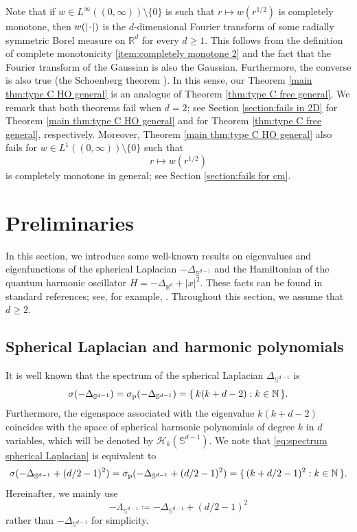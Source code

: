 \documentclass[reqno]{amsart}
\theoremstyle{plain}
\numberwithin{equation}{section}
\theoremstyle{remark}
\newcommand*{\variabledot}{\makebox[1ex]{\textbf{$\cdot$}}}
\newcommand{\R}{\mathbb{R}}
\newcommand{\N}{\mathbb{N}}
\renewcommand{\S}{\mathbb{S}}
\newcommand{\intervaloo}[2]{(#1, #2)}
\newcommand{\abs}[1]{\lvert#1\rvert}
\newcommand{\set}[2]{\{ \, #1 : #2 \, \} }
\newcommand{\Hamiltonian}{H}
\newcommand{\Laplacian}{\Delta}
\newcommand{\LaplacianR}{\Laplacian_{\R^d}}
\newcommand{\LaplacianS}{\Laplacian_{\S^{d-1}}}
\newcommand{\LambdaS}{\Lambda_{\S^{d-1}}}
\newcommand{\HPk}[1]{ \mathcal{H}_{#1} }
\begin{document}
Note that if $w \in L^\infty(\intervaloo{0}{\infty}) \setminus \{0\}$ is such that $r \mapsto w(r^{1/2})$ is completely monotone, then $w(\abs{\variabledot})$ is the $d$-dimensional Fourier transform of some radially symmetric Borel measure on $\R^d$ for every $d \geq 1$.
This follows from the definition of complete monotonicity \ref{item:completely monotone 2} and the fact that the Fourier transform of the Gaussian is also the Gaussian. 
Furthermore, the converse is also true (the Schoenberg theorem \cite[Theorem 2]{Sch1938}). 
In this sense, our Theorem \ref{main thm:type C HO general} is an analogue of Theorem \ref{thm:type C free general}.
We remark that both theorems fail when $d=2$; see Section \ref{section:fails in 2D} for Theorem \ref{main thm:type C HO general} and \citet[Theorem 6.2]{Suz2025} for Theorem \ref{thm:type C free general}, respectively.
Moreover, Theorem \ref{main thm:type C HO general} also fails for $w \in L^1(\intervaloo{0}{\infty}) \setminus \{0\}$ such that
\begin{equation}
	r \longmapsto w(r^{1/2})
\end{equation}
is completely monotone in general; see Section \ref{section:fails for cm}.
\section{Preliminaries} \label{section:preliminaries}
In this section, we introduce some well-known results on eigenvalues and eigenfunctions of the spherical Laplacian $-\LaplacianS$ and the Hamiltonian of the quantum harmonic oscillator $\Hamiltonian = - \LaplacianR + \abs{x}^2$.
These facts can be found in standard references; see, for example, \citet{Mul1966, Tha1993, Sze1975}. 
Throughout this section, we assume that $d \geq 2$.
\subsection{Spherical Laplacian and harmonic polynomials} \label{section:spherical Laplacian}
It is well known that the spectrum of the spherical Laplacian $\LaplacianS$ is
\begin{equation} \label{eq:spectrum spherical Laplacian}
\sigma(-\LaplacianS) = \sigma_{\textup{p}}(-\LaplacianS) = \set{ k (k + d - 2) }{ k \in \N } .
\end{equation}
Furthermore, the eigenspace associated with the eigenvalue $k (k + d - 2)$ coincides with the space of spherical harmonic polynomials of degree $k$ in $d$ variables, which will be denoted by $\HPk{k}(\S^{d-1})$.
We note that \eqref{eq:spectrum spherical Laplacian} is equivalent to 
\begin{equation}
\sigma(-\LaplacianS + (d/2-1)^2) = \sigma_{\textup{p}}(-\LaplacianS + (d/2-1)^2) = \set{ (k + d/2 - 1)^2 }{ k \in \N } .
\end{equation}
Hereinafter, we mainly use
\begin{equation}
-\LambdaS \coloneqq -\LaplacianS + (d/2-1)^2
\end{equation}
rather than $-\LaplacianS$ for simplicity. 
\end{document}

